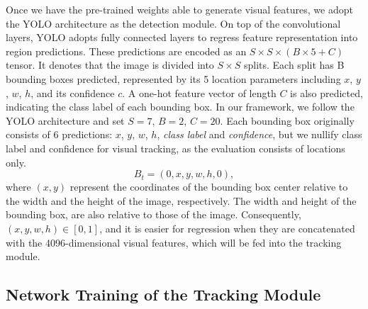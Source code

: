 \documentclass{article}
\begin{document}
Once we have the pre-trained weights able to generate visual features, we adopt the YOLO architecture as the detection module. %
On top of the convolutional layers, YOLO adopts fully connected layers to regress feature representation into region predictions. 
These predictions are encoded as an $S \times S \times (B \times 5 + C)$ tensor. It denotes that the image is divided into $S \times S$ splits. Each split has B bounding boxes predicted, represented by its 5 location parameters including $x$, $y$, $w$, $h$, and its confidence $c$. A one-hot feature vector of length $C$ is also predicted, indicating the class label of each bounding box. In our framework, we follow the YOLO architecture and set $S = 7$, $B= 2$, $C= 20$. 
Each bounding box originally consists of 6 predictions: $x$, $y$, $w$, $h$, \textit{class label} and \textit{confidence}, but we nullify class label and confidence for visual tracking, as the evaluation consists of locations only.  
\begin{equation}
B_{t} = (0, x, y, w, h, 0),
\end{equation}
where $(x, y)$ represent the coordinates of the bounding box center relative to the width and the height of the image, respectively. The width and height of the bounding box, are also relative to those of the image. Consequently, $(x, y, w, h) \in [0, 1]$, and it is easier for regression when they are concatenated with the 4096-dimensional visual features, which will be fed into the tracking module.

\subsection{Network Training of the Tracking Module}
\end{document}
